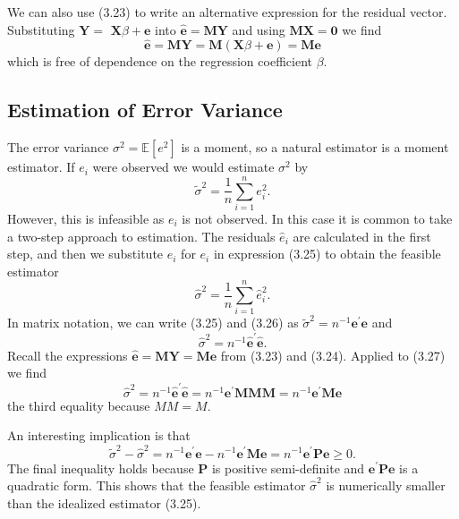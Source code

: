 \documentclass[10pt]{article}
\begin{document}
We can also use (3.23) to write an alternative expression for the residual vector. Substituting $\boldsymbol{Y}=$ $\boldsymbol{X} \beta+\boldsymbol{e}$ into $\widehat{\boldsymbol{e}}=\boldsymbol{M} \boldsymbol{Y}$ and using $\boldsymbol{M} \boldsymbol{X}=\mathbf{0}$ we find
$$
\widehat{\boldsymbol{e}}=\boldsymbol{M} \boldsymbol{Y}=\boldsymbol{M}(\boldsymbol{X} \beta+\boldsymbol{e})=\boldsymbol{M} \boldsymbol{e}
$$
which is free of dependence on the regression coefficient $\beta$.

\subsection{Estimation of Error Variance}
The error variance $\sigma^{2}=\mathbb{E}\left[e^{2}\right]$ is a moment, so a natural estimator is a moment estimator. If $e_{i}$ were observed we would estimate $\sigma^{2}$ by
$$
\widetilde{\sigma}^{2}=\frac{1}{n} \sum_{i=1}^{n} e_{i}^{2} .
$$
However, this is infeasible as $e_{i}$ is not observed. In this case it is common to take a two-step approach to estimation. The residuals $\widehat{e}_{i}$ are calculated in the first step, and then we substitute $\widehat{e}_{i}$ for $e_{i}$ in expression (3.25) to obtain the feasible estimator
$$
\widehat{\sigma}^{2}=\frac{1}{n} \sum_{i=1}^{n} \widehat{e}_{i}^{2} .
$$
In matrix notation, we can write (3.25) and (3.26) as $\widetilde{\sigma}^{2}=n^{-1} \boldsymbol{e}^{\prime} \boldsymbol{e}$ and
$$
\widehat{\sigma}^{2}=n^{-1} \widehat{\boldsymbol{e}}^{\prime} \widehat{\boldsymbol{e}} .
$$
Recall the expressions $\widehat{\boldsymbol{e}}=\boldsymbol{M} \boldsymbol{Y}=\boldsymbol{M} \boldsymbol{e}$ from (3.23) and (3.24). Applied to (3.27) we find
$$
\widehat{\sigma}^{2}=n^{-1} \widehat{\boldsymbol{e}}^{\prime} \widehat{\boldsymbol{e}}=n^{-1} \boldsymbol{e}^{\prime} \boldsymbol{M M} \boldsymbol{M}=n^{-1} \boldsymbol{e}^{\prime} \boldsymbol{M} \boldsymbol{e}
$$
the third equality because $M M=M$.

An interesting implication is that
$$
\widetilde{\sigma}^{2}-\widehat{\sigma}^{2}=n^{-1} \boldsymbol{e}^{\prime} \boldsymbol{e}-n^{-1} \boldsymbol{e}^{\prime} \boldsymbol{M} \boldsymbol{e}=n^{-1} \boldsymbol{e}^{\prime} \boldsymbol{P} \boldsymbol{e} \geq 0 .
$$
The final inequality holds because $\boldsymbol{P}$ is positive semi-definite and $\boldsymbol{e}^{\prime} \boldsymbol{P} \boldsymbol{e}$ is a quadratic form. This shows that the feasible estimator $\widehat{\sigma}^{2}$ is numerically smaller than the idealized estimator (3.25).
\end{document}
